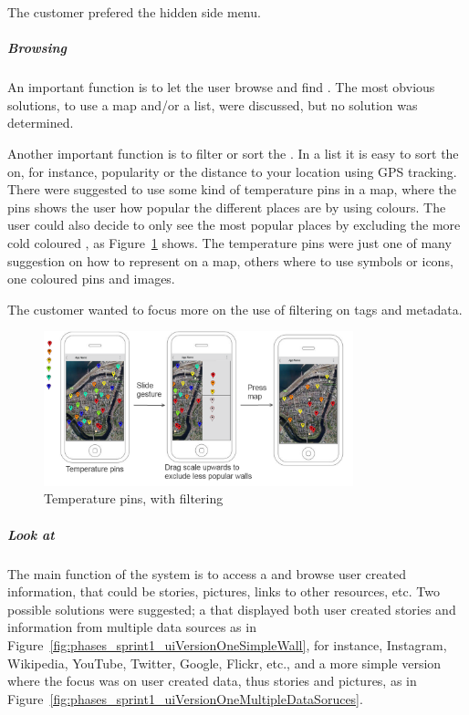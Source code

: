 \documentclass[11pt]{book}
\begin{document}
The customer prefered the hidden side menu.

\subparagraph{Browsing \wallentityp}
An important function is to let the user browse and find \wallentityp. The most obvious solutions, to use a map and/or a list, were discussed, but no solution was determined. 

Another important function is to filter or sort the \wallentityp. In a list it is easy to sort the \wallentityp on, for instance, popularity or the distance to your location using GPS tracking. There were suggested to use some kind of temperature pins in a map, where the pins shows the user how popular the different places are by using colours. The user could also decide to only see the most popular places by excluding the more cold coloured \wallentityp, as Figure~\ref{fig:phases_sprint1_uiVersionOneTempPings} shows. The temperature pins were just one of many suggestion on how to represent \wallentityp on a map, others where to use symbols or icons, one coloured pins and images.

The customer wanted to focus more on the use of filtering on tags and metadata.

\begin{figure}[H]
    \centering
    \includegraphics[width=0.8\textwidth]{Figures/Phases/Sprint1/versiononeTempPings.png}
    \caption{Temperature pins, with filtering}
    \label{fig:phases_sprint1_uiVersionOneTempPings}
\end{figure}

\subparagraph{Look at \wallentityp}
The main function of the system is to access a \wallentitys and browse user created information, that could be stories, pictures, links to other resources, etc. Two possible solutions were suggested; a \wallentitys that displayed both user created stories and information from multiple data sources as in Figure~\ref{fig:phases_sprint1_uiVersionOneSimpleWall}, for instance, Instagram, Wikipedia, YouTube, Twitter, Google, Flickr, etc., and a more simple version where the focus was on user created data, thus stories and pictures, as in Figure~\ref{fig:phases_sprint1_uiVersionOneMultipleDataSoruces}. %
\end{document}
